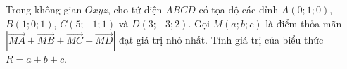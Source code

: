 \begin{ex}
Trong không gian $Oxyz$, cho tứ diện $ABCD$ có tọa độ các đỉnh $A(0;1;0)$, $B(1;0;1)$, $C(5;-1;1)$ và $D(3;-3;2)$. Gọi $M(a;b;c)$ là điểm thỏa mãn $\left|\overrightarrow{MA}+\overrightarrow{MB}+\overrightarrow{MC}+\overrightarrow{MD}\right|$ đạt giá trị nhỏ nhất. Tính giá trị của biểu thức $R=a+b+c$.
\end{ex}

